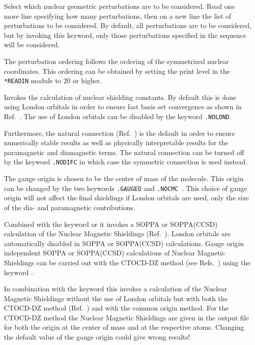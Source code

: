 \begin{description}
Select which nuclear geometric perturbations are to be considered.
Read one more line specifying how many perturbations, then on a
new line the list of perturbations to be considered. By default,
all perturbations are to be considered, but by invoking this keyword,
only those perturbations specified in the sequence will be considered. 

The perturbation ordering follows the ordering of the symmetrized
nuclear coordinates. This ordering can be obtained by setting the
print level in the \verb|*READIN| module to 20 or higher.

\item[\Key{SHIELD}] Invokes the calculation of nuclear
shielding constants. By default this is done
using London orbitals in order to 
ensure fast basis set convergence as shown in
Ref.~\cite{kwjfhppjacs112,krthrkpjklbhjajjcp100}. The use of London
orbitals can be disabled by the keyword \verb|.NOLOND|.

Furthermore, the natural connection
(Ref.~\cite{joklbkrthpjtca90,krthjopjklbcpl235}) is the default in order to ensure
numerically stable results as well as physically interpretable
results for the paramagnetic and diamagnetic terms. The natural
connection can be turned off by the keyword \verb|.NODIFC| in which
case the symmetric connection is used instead.


The gauge origin is chosen to be the center of
mass of the molecule.
This origin can be changed by the two keywords \verb|.GAUGEO| and
\verb|.NOCMC |. This choice of gauge origin will not affect
the final shieldings if London orbitals are used, only the size of the
dia- and paramagnetic contributions.

Combined with the keyword  or  it invokes a SOPPA 
or SOPPA(CCSD) calculation of the Nuclear Magnetic Shieldings 
(Ref.~\cite{paololazz1,paololazz2,ctocd}). London orbitals are automatically disabled in 
SOPPA or SOPPA(CCSD) 
calculations. Gauge origin independent SOPPA or SOPPA(CCSD) calculations of Nuclear 
Magnetic Shieldings can be carried out with the CTOCD-DZ method 
(see Refs.~\cite{paololazz1,paololazz2,ctocd}) using the keyword .

In combination with the keyword  this invokes a calculation of the
Nuclear Magnetic Shieldings without the use of London orbitals but with both 
the CTOCD-DZ method (Ref.~\cite{paololazz1,paololazz2,ctocd}) and with the common 
origin method. For the CTOCD-DZ method the Nuclear Magnetic Shieldings are given in
the output file for both the origin at the center of mass and at the respective atoms.
Changing the default value of the gauge origin could give wrong results!


\end{description}
